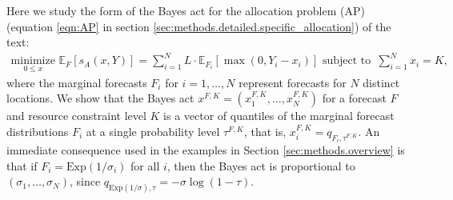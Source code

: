 \documentclass{article}\usepackage[]{graphicx}\usepackage[]{xcolor}
\begin{document}
Here we study the form of the Bayes act for the allocation problem (AP) (equation \eqref{eqn:AP} in section
\ref{sec:methods.detailed.specific_allocation}) of the text:
\begin{align}
    \underset{0 \leq x}{\mathrm{minimize}}\,\, 
    \mathbb{E}_{F} [s_A(x, Y)]= \sum_{i=1}^{N} L \cdot \mathbb{E}_{F_i}[\max(0, Y_i - x_i)]
     \text{ subject to }
     \, \sum_{i=1}^N x_i = K, \label{eqn:AP-long}
\end{align}
where the marginal forecasts $F_i$ for $i=1,\dots,N$ represent forecasts for $N$ distinct locations. We show that the
Bayes act $x^{F,K} = (x_1^{F,K},\ldots,x_N^{F,K})$ for a forecast $F$ and resource constraint level $K$ is a vector of
quantiles of the marginal forecast distributions $F_i$ at a single probability level $\tau^{F,K}$, that is, $x_i^{F,K} =
q_{F_i,\tau^{F,K}}$. An immediate consequence used in the examples in Section \ref {sec:methods.overview} is that if
$F_i = \mathrm{Exp}(1/\sigma_i)$ for all $i$, then the Bayes act is proportional to $(\sigma_1,\ldots,\sigma_N)$, since
$q_{\mathrm{Exp}(1/\sigma),\tau} = -\sigma \log(1-\tau)$.
\end{document}
